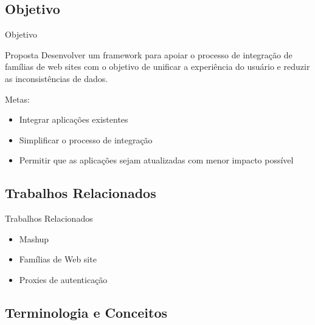 \documentclass{beamer}
\begin{document}
\subsection{Objetivo}

\begin{frame}{Objetivo}
    \begin{block}{Proposta}
        Desenvolver um framework para apoiar o processo de integração de famílias de web sites com o objetivo de unificar a experiência do usuário e reduzir as inconsistências de dados.
    \end{block}
    
    Metas:
    \begin{itemize}
        \item{Integrar aplicações existentes}
        \item{Simplificar o processo de integração}
        \item{Permitir que as aplicações sejam atualizadas com menor impacto possível}
    \end{itemize}
\end{frame}

\subsection{Trabalhos Relacionados}

\begin{frame}{Trabalhos Relacionados}
  \begin{itemize}
  \item {Mashup \cite{Yu2007} \cite{Yu2008} \cite{Daniel2011}}
  \item {Famílias de Web site\cite{Eichinger2009}}
  \item {Proxies de autenticação \cite{Takada2012}}
  \end{itemize}
\end{frame}

\subsection{Terminologia e Conceitos}
\end{document}
